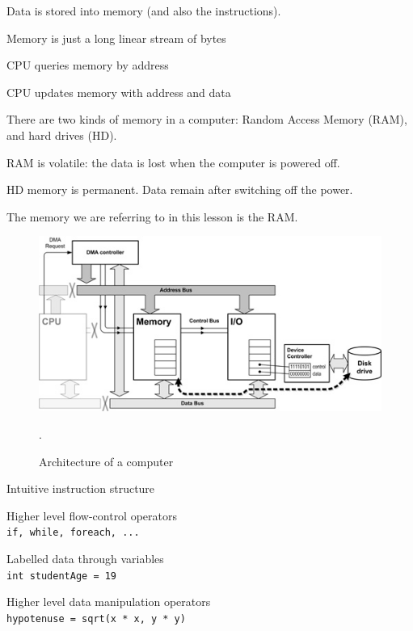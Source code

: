 \documentclass{beamer}
\begin{document}
\begin{slide}{
\item Data is stored into memory (and also the instructions).
\item Memory is just a long linear stream of bytes
\item CPU queries memory by address
\item CPU updates memory with address and data
}\end{slide}

\begin{slide}{
\item There are two kinds of memory in a computer: Random Access Memory (RAM), and hard drives (HD).
\item RAM is volatile: the data is lost when the computer is powered off.
\item HD memory is permanent. Data remain after switching off the power.
\item The memory we are referring to in this lesson is the RAM.
}\end{slide}

\begin{slide}{\item[] \begin{figure}
\includegraphics[scale=3.0]{../img/computer_architecture}
\caption{Architecture of a computer}.
\end{figure}}
\end{slide}

\begin{slide}{
\item Intuitive instruction structure
\item Higher level flow-control operators \\ \texttt{if, while, foreach, ...}
\item Labelled data through variables \\ \texttt{int studentAge = 19}
\item Higher level data manipulation operators \\ \texttt{hypotenuse = sqrt(x * x, y * y)}
}\end{slide}
\end{document}
